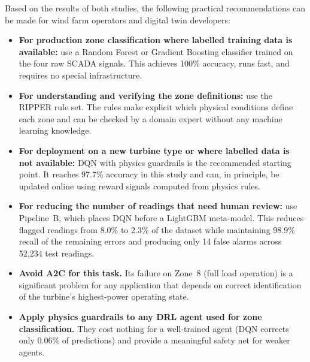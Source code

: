 Based on the results of both studies, the following practical recommendations can be made
for wind farm operators and digital twin developers:

\begin{itemize}
  \item \textbf{For production zone classification where labelled training data is
        available:} use a Random Forest or Gradient Boosting classifier trained on the
        four raw SCADA signals. This achieves 100\% accuracy, runs fast, and requires no
        special infrastructure.

  \item \textbf{For understanding and verifying the zone definitions:} use the RIPPER
        rule set. The rules make explicit which physical conditions define each zone and
        can be checked by a domain expert without any machine learning knowledge.

  \item \textbf{For deployment on a new turbine type or where labelled data is not
        available:} DQN with physics guardrails is the recommended starting point. It
        reaches 97.7\% accuracy in this study and can, in principle, be updated online
        using reward signals computed from physics rules.

  \item \textbf{For reducing the number of readings that need human review:} use
        Pipeline~B, which places DQN before a LightGBM meta-model. This reduces flagged
        readings from 8.0\% to 2.3\% of the dataset while maintaining 98.9\% recall of
        the remaining errors and producing only 14 false alarms across 52,234 test
        readings.

  \item \textbf{Avoid A2C for this task.} Its failure on Zone~8 (full load operation) is
        a significant problem for any application that depends on correct identification
        of the turbine's highest-power operating state.

  \item \textbf{Apply physics guardrails to any DRL agent used for zone classification.}
        They cost nothing for a well-trained agent (DQN corrects only 0.06\% of
        predictions) and provide a meaningful safety net for weaker agents.
\end{itemize}
